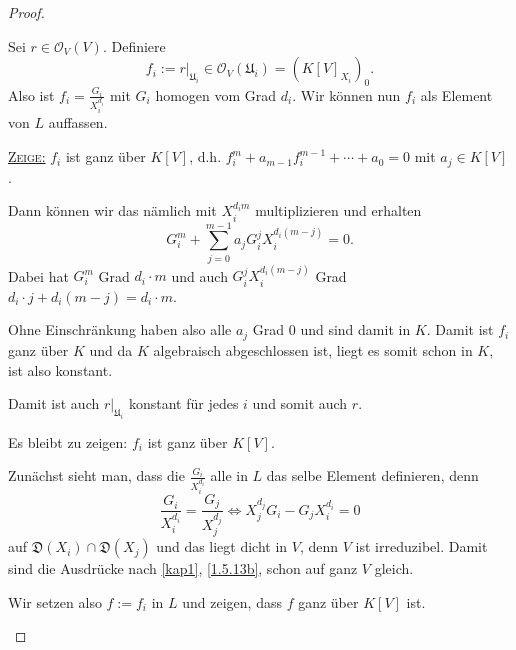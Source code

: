 \documentclass[a4paper,12pt,index=toc]{scrbook}
\theoremstyle{keinenummern} %
\def\O{\mathcal{O}}
\newcommand{\D}{\mathfrak{D}}
\def\U{\mathfrak{U}}
\newcommand{\restrict}[1]{|_{#1}}
\begin{document}
\begin{proof}
\begin{enumerate}
Sei $r\in\O_{V}(V)$. Definiere
\begin{equation*}f_{i}:=r\restrict{\U_{i}}\in\O_{V}(\U_{i})=(K[V]_{X_{i}})_{0}.\end{equation*}
Also ist $f_{i}=\frac{G_{i}}{X_{i}^{d_{i}}}$ mit $G_{i}$ homogen vom Grad $d_{i}$. Wir können nun $f_{i}$ als Element von $L$ auffassen.

\hyperlink{s5bzz}{{\scshape Zeige:}} $f_{i}$ ist ganz über $K[V]$, d.h. $f_{i}^{m}+a_{m-1}f_{i}^{m-1}+\dotsm+a_{0}=0$ mit $a_{j}\in K[V]$.

Dann können wir das nämlich mit $X_{i}^{d_{i}m}$ multiplizieren und erhalten
\begin{equation*}G_{i}^{m}+\sum_{j=0}^{m-1}a_{j}G_{i}^{j}X_{i}^{d_{i}(m-j)}=0.\end{equation*}
Dabei hat $G_{i}^{m}$ Grad $d_{i}\cdot m$ und auch $G_{i}^{j}X_{i}^{d_{i}(m-j)}$ Grad $d_{i}\cdot j+d_{i}(m-j)=d_{i}\cdot m$.

Ohne Einschränkung haben also alle $a_{j}$ Grad $0$ und sind damit in $K$. Damit ist $f_{i}$ ganz über $K$ und da $K$ algebraisch abgeschlossen ist, liegt es somit schon in $K$, ist also konstant.

Damit ist auch $r\restrict{\U_{i}}$ konstant für jedes $i$ und somit auch $r$.

\hypertarget{s5bzz}{Es bleibt zu zeigen: $f_{i}$ ist ganz über $K[V]$.}

Zunächst sieht man, dass die $\frac{G_{i}}{X_{i}^{d_{i}}}$ alle in $L$ das selbe Element definieren, denn
\begin{equation*}\frac{G_{i}}{X_{i}^{d_{i}}}=\frac{G_{j}}{X_{j}^{d_{j}}}\iff X_{j}^{d_{j}}G_{i}-G_{j}X_{i}^{d_{i}}=0\end{equation*}
auf $\D(X_{i})\cap\D(X_{j})$ und das liegt dicht in $V$, denn $V$ ist irreduzibel. Damit sind die Ausdrücke nach \cref{kap1}, \cref{1.5.13b}, schon auf ganz $V$ gleich.

Wir setzen also $f:=f_{i}$ in $L$ und zeigen, dass $f$ ganz über $K[V]$ ist.


\end{enumerate}
\end{proof}
\end{document}
